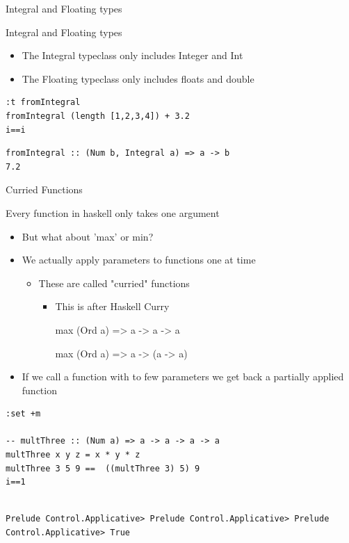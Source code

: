 \documentclass[presetation]{beamer}
\begin{document}
\begin{frame}[fragile,label={sec:org729c9c8}]{Integral and Floating types}
 \begin{block}{Integral and Floating types}
\begin{itemize}
\item The Integral typeclass only includes Integer and Int
\item The Floating typeclass only includes floats and double
\end{itemize}
\begin{verbatim}
:t fromIntegral
fromIntegral (length [1,2,3,4]) + 3.2
i==i
\end{verbatim}

\begin{verbatim}
fromIntegral :: (Num b, Integral a) => a -> b
7.2
\end{verbatim}
\end{block}
\end{frame}


\begin{frame}[fragile,label={sec:org791ccad}]{Curried Functions}
 \begin{block}{Every function in haskell only takes one argument}
\begin{itemize}
\item But what about  'max' or min?
\item We actually apply parameters to functions one at time
\begin{itemize}
\item These are called "curried" functions
\begin{itemize}
\item This is after Haskell Curry
\item[{max}] (Ord a) => a -> a -> a
\item[{max}] (Ord a) => a -> (a -> a)
\end{itemize}
\end{itemize}
\item If we call a function with to few parameters we get back a partially
applied function
\end{itemize}
\begin{verbatim}
:set +m

-- multThree :: (Num a) => a -> a -> a -> a  
multThree x y z = x * y * z  
multThree 3 5 9 ==  ((multThree 3) 5) 9
i==1
\end{verbatim}

\begin{verbatim}

Prelude Control.Applicative> Prelude Control.Applicative> Prelude Control.Applicative> True
\end{verbatim}
\end{block}
\end{frame}
\end{document}
